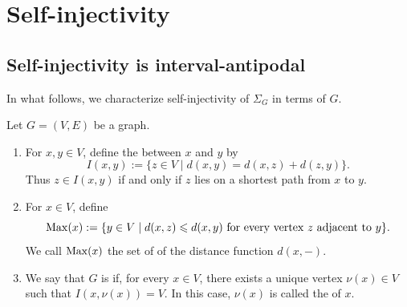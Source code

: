 \documentclass[a4paper,leqno]{amsart}
\begin{document}
\section{Self-injectivity}\label{sec:self-inj}

\subsection{Self-injectivity is interval-antipodal}
In what follows, we characterize self-injectivity of $\Sigma_G$ in terms of $G$.

\begin{dfn}\label{def:antipodal}
Let $G=(V,E)$ be a graph. \begin{enumerate}
    \item For $x,y\in V$, define the  between $x$ and $y$ by
$$I(x,y):=\{z\in V\mid d(x,y)=d(x,z)+d(z,y)\}.$$
Thus $z\in I(x,y)$ if and only if $z$ lies on a shortest path from $x$ to $y$.
\item For $x\in V$, define
$$\operatorname{Max}(x):=\{y\in V\mid d(x,z)\leqslant d(x,y)\text{ for every vertex }z\text{ adjacent to }y\}.$$
We call $\operatorname{Max}(x)$ the set of  of the distance function $d(x,-)$.
\item We say that $G$ is  if, for every $x\in V$, there exists a unique vertex $\nu(x)\in V$ such that $I(x,\nu(x))=V$.
In this case, $\nu(x)$ is called the  of $x$.
\end{enumerate}
\end{dfn}
\end{document}
